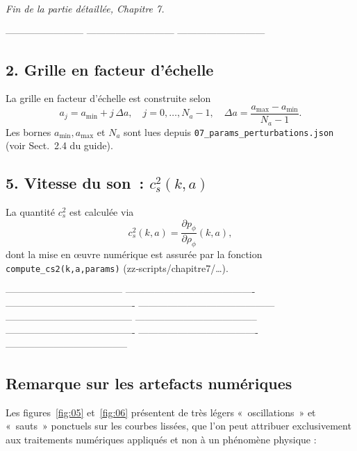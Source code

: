 \bigskip
\noindent\emph{Fin de la partie détaillée, Chapitre 7.}

------------------------
---------------------------
---------------------------

\subsection{2. Grille en facteur d’échelle}
La grille en facteur d’échelle est construite selon
\[
  a_j = a_{\min} + j\,\Delta a,\quad
  j=0,\dots, N_a-1,
  \quad \Delta a=\frac{a_{\max}-a_{\min}}{N_a-1}.
\]
Les bornes \(a_{\min},a_{\max}\) et \(N_a\) sont lues depuis
\texttt{07\_params\_perturbations.json} (voir Sect.~2.4 du guide).


\subsection{5. Vitesse du son : \(c_s^2(k,a)\)}
La quantité \(c_s^2\) est calculée via
\[
  c_s^2(k,a)=\frac{\partial p_\phi}{\partial\rho_\phi}(k,a),
\]
dont la mise en œuvre numérique est assurée par la fonction
\texttt{compute\_cs2(k,a,params)} (zz‑scripts/chapitre7/…).


------------------------------------
----------------------------------------
----------------------------------------
------------------------------------------
---------------------------------------
--------------------------------------
----------------------------------------
-------------------------------------
--------------------------------------

\subsection{Remarque sur les artefacts numériques}

Les figures~\ref{fig:05} et~\ref{fig:06} présentent de très légers « oscillations » et « sauts » ponctuels sur les courbes lissées, que l’on peut attribuer exclusivement aux traitements numériques appliqués et non à un phénomène physique :

